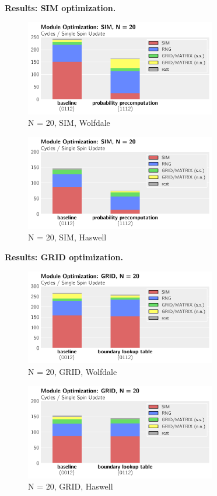 \documentclass[letterpaper]{article}
\newcommand{\mypar}[1]{{\bf #1.}}
\begin{document}
\mypar{Results: SIM optimization}
	\begin{figure}[h]\centering
	  \includegraphics[width = 8.36cm]{plots/msk_20_2.pdf}
	  \caption{N = 20, SIM, Wolfdale}
	\end{figure}
	\begin{figure}[h]\centering
	  \includegraphics[width = 8.36cm]{plots/dg_20_2.pdf}
	  \caption{N = 20, SIM, Haswell}
	\end{figure}

\mypar{Results: GRID optimization}
	\begin{figure}[h]\centering
	  \includegraphics[width = 8.36cm]{plots/msk_20_1.pdf}
	  \caption{N = 20, GRID, Wolfdale}
	\end{figure}
	\begin{figure}[h]\centering
	  \includegraphics[width = 8.36cm]{plots/dg_20_1.pdf}
	  \caption{N = 20, GRID, Haswell}
	\end{figure}
\end{document}
